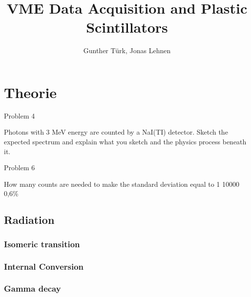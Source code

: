 \documentclass[]{article}
\title{VME Data Acquisition and Plastic Scintillators}
\author{Gunther T\"urk, Jonas Lehnen}
\begin{document}
\maketitle
\begin{abstract}


\end{abstract}

\tableofcontents

\newpage
\section{Theorie}








Problem 4 

Photons with 3 MeV energy are counted by a NaI(TI) detector. Sketch the expected spectrum and explain what you sketch and the physics process beneath it. 


Problem 6 

How many counts are needed to make the standard deviation equal to 1%
10000
0,6\%

\subsection{Radiation}\label{radiation}

\subsubsection{Isomeric transition}
\subsubsection{Internal Conversion}
\subsubsection{Gamma decay}

\end{document}
